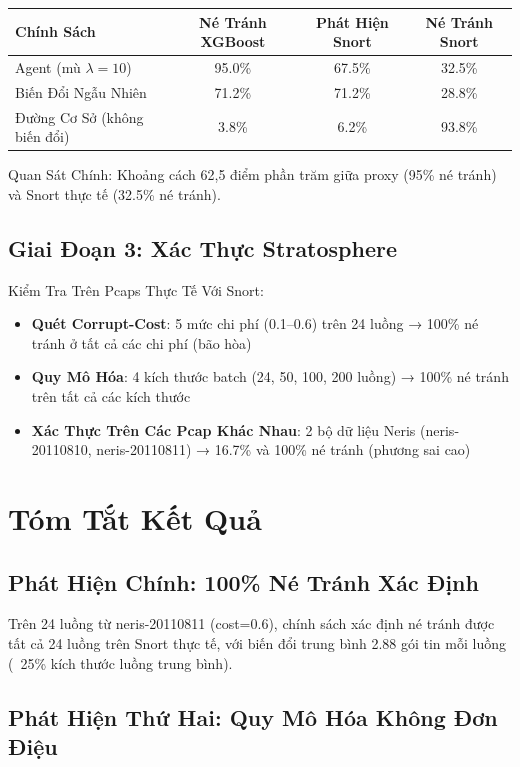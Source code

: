 \documentclass[12pt,a4paper]{report}
\begin{document}
\begin{table}[h]
\centering
\begin{tabular}{l|c|c|c}
Chính Sách & Né Tránh XGBoost & Phát Hiện Snort & Né Tránh Snort \\
\hline
Agent (mù $\lambda=10$) & 95.0\% & 67.5\% & 32.5\% \\
Biến Đổi Ngẫu Nhiên & 71.2\% & 71.2\% & 28.8\% \\
Đường Cơ Sở (không biến đổi) & 3.8\% & 6.2\% & 93.8\% \\
\end{tabular}
\end{table}

Quan Sát Chính: Khoảng cách 62,5 điểm phần trăm giữa proxy (95\% né tránh) và Snort thực tế (32.5\% né tránh).

\subsection{Giai Đoạn 3: Xác Thực Stratosphere}

Kiểm Tra Trên Pcaps Thực Tế Với Snort:

\begin{itemize}
  \item \textbf{Quét Corrupt-Cost}: 5 mức chi phí (0.1–0.6) trên 24 luồng → 100\% né tránh ở tất cả các chi phí (bão hòa)
  \item \textbf{Quy Mô Hóa}: 4 kích thước batch (24, 50, 100, 200 luồng) → 100\% né tránh trên tất cả các kích thước
  \item \textbf{Xác Thực Trên Các Pcap Khác Nhau}: 2 bộ dữ liệu Neris (neris-20110810, neris-20110811) → 16.7\% và 100\% né tránh (phương sai cao)
\end{itemize}

\section{Tóm Tắt Kết Quả}

\subsection{Phát Hiện Chính: 100\% Né Tránh Xác Định}

Trên 24 luồng từ neris-20110811 (cost=0.6), chính sách xác định né tránh được tất cả 24 luồng trên Snort thực tế, với biến đổi trung bình 2.88 gói tin mỗi luồng (~25\% kích thước luồng trung bình).

\subsection{Phát Hiện Thứ Hai: Quy Mô Hóa Không Đơn Điệu}
\end{document}
